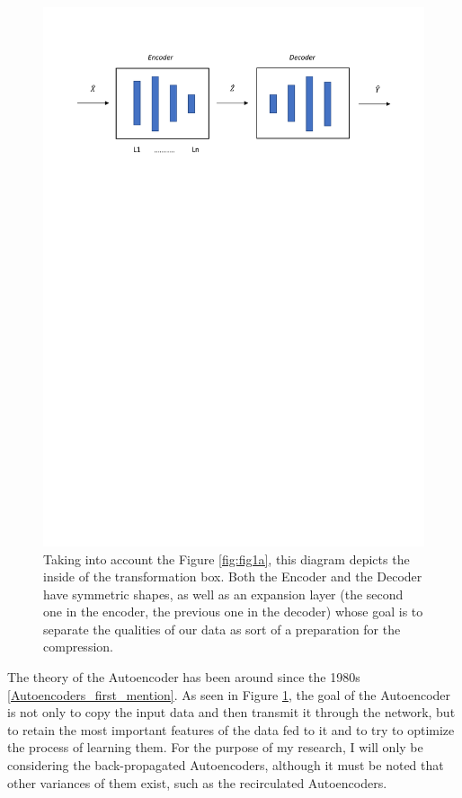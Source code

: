 \begin{figure}[H]
 \centering
  \includegraphics[width=16cm]{Figuras_tfg/Figura_autoencoder}
  \caption{Taking into account the Figure \ref{fig:fig1a}, this diagram depicts the inside of the transformation box. Both the Encoder and the Decoder have symmetric shapes, as well as an expansion layer (the second one in the encoder, the previous one in the decoder) whose goal is to separate the qualities of our data as sort of a preparation for the compression.}
 \label{fig:figure_autoencoder}
\end{figure} 

The theory of the Autoencoder has been around since the 1980s \ref{Autoencoders_first_mention}. As seen in Figure \ref{fig:figure_autoencoder}, the goal of the Autoencoder is not only to copy the input data and then transmit it through the network, but to retain the most important features of the data fed to it and to try to optimize the process of learning them. For the purpose of my research, I will only be considering the back-propagated Autoencoders, although it must be noted that other variances of them exist, such as the recirculated Autoencoders. \par

